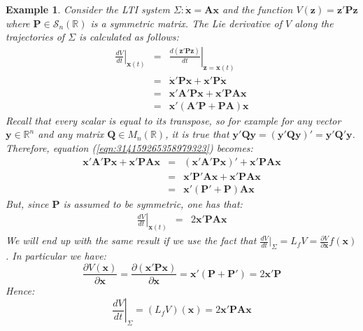 \documentclass[a4paper,10pt,oneside]{book}
\newtheorem{example}{Example}
\begin{document}
\begin{example}
 Consider the LTI system $\Sigma:\dot{\mathbf{x}}=\mathbf{Ax}$ and the function $V(\mathbf{z})=\mathbf{z}'\mathbf{Pz}$ where $\mathbf{P}\in \mathcal{S}_n(\mathbb{R})$ is a symmetric matrix. The Lie derivative of $V$ along the trajectories of $\Sigma$ is calculated as follows:
\begin{eqnarray}
 \left.\frac{dV}{dt}\right|_{\mathbf{x}(t)} &=& \left. \frac{d\left( \mathbf{z}'\mathbf{Pz} \right)}{dt} \right|_{\mathbf{z}=\mathbf{x}(t)}\\
&=& \dot{\mathbf{x}}'\mathbf{Px}+\mathbf{x}'\mathbf{P}\dot{\mathbf{x}}\\
&=& \mathbf{x}'\mathbf{A}'\mathbf{Px}+\mathbf{x}'\mathbf{PAx}\label{eqn:314159265358979323}\\
&=& \mathbf{x}'(\mathbf{A}'\mathbf{P}+\mathbf{PA})\mathbf{x}
\end{eqnarray}
Recall that every scalar is equal to its transpose, so for example for any vector $\mathbf{y}\in\mathbb{R}^n$ and any matrix $\mathbf{Q}\in M_n(\mathbb{R})$, it is true that $\mathbf{y}'\mathbf{Qy}=(\mathbf{y}'\mathbf{Qy})'=\mathbf{y}'\mathbf{Q}'\mathbf{y}$. Therefore, equation (\ref{eqn:314159265358979323}) becomes:
\begin{eqnarray}
 \mathbf{x}'\mathbf{A}'\mathbf{Px}+\mathbf{x}'\mathbf{PAx} &=& (\mathbf{x}'\mathbf{A}'\mathbf{Px})'+\mathbf{x}'\mathbf{PAx}\\
&=&\mathbf{x}'\mathbf{P}'\mathbf{Ax}+\mathbf{x}'\mathbf{PAx}\\
&=&\mathbf{x}'(\mathbf{P}'+\mathbf{P})\mathbf{A}\mathbf{x}
\end{eqnarray}
But, since $\mathbf{P}$ is assumed to be symmetric, one has that:
\begin{eqnarray}
 \left.\frac{dV}{dt}\right|_{\mathbf{x}(t)} &=& 2\mathbf{x}'\mathbf{PAx}
\end{eqnarray}
We will end up with the same result if we use the fact that $\frac{dV}{dt}|_\Sigma= L_f V = \frac{\partial V}{\partial \mathbf{x}} f(\mathbf{x})$. In particular we have:
\begin{equation}
 \frac{\partial V(\mathbf{x})}{\partial \mathbf{x}}=\frac{\partial (\mathbf{x}'\mathbf{Px})}{\partial\mathbf{x}}=\mathbf{x}'(\mathbf{P}+\mathbf{P}')=2\mathbf{x}'\mathbf{P}
\end{equation}
Hence:
\begin{equation}
 \left.\frac{dV}{dt}\right|_{\Sigma} = (L_f V)(\mathbf{x})=2\mathbf{x}'\mathbf{PAx}
\end{equation}

\end{example}
\end{document}
